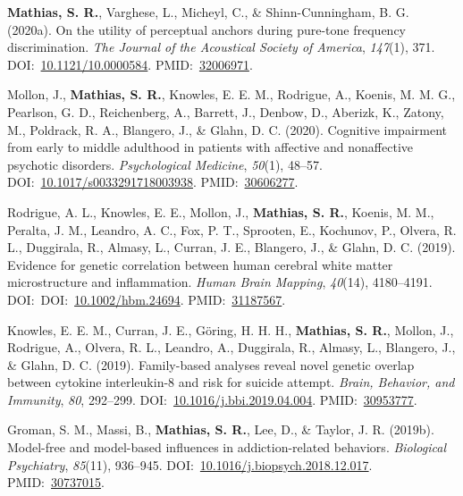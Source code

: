\documentclass[10pt]{article}
\makeatletter
\newlength{\bibhang}
\newlength{\bibsep}
 {\@listi \global\bibsep\itemsep \global\advance\bibsep by\parsep}
\newenvironment{bibsection}%
        {\vspace{-\baselineskip}\begin{list}{}{%
       \setlength{\leftmargin}{\bibhang}%
       \setlength{\itemindent}{-\leftmargin}%
       \setlength{\itemsep}{\bibsep}%
       \setlength{\parsep}{\z@}%
        \setlength{\partopsep}{0pt}%
        \setlength{\topsep}{0pt}}}
        {\end{list}\vspace{-.6\baselineskip}}
\makeatother
\begin{document}
\begin{bibsection}
\item \textbf{Mathias, S. R.}, Varghese, L.,  Micheyl, C., \& Shinn-Cunningham, B. G. (2020a). On the utility of perceptual anchors during pure-tone frequency discrimination. \emph{The Journal of the Acoustical Society of America}, \emph{147}(1), 371. 
DOI:~\href{https://doi.org/10.1121/10.0000584}{10.1121/10.0000584}. PMID:~\href{https://www.ncbi.nlm.nih.gov/pubmed/?term=32006971}{32006971}.

\item Mollon, J., \textbf{Mathias, S. R.}, Knowles, E. E. M., Rodrigue, A., Koenis, M. M. G., Pearlson, G. D., Reichenberg, A., Barrett, J., Denbow, D., Aberizk, K., Zatony, M., Poldrack, R. A., Blangero, J., \& Glahn, D. C. (2020). Cognitive impairment from early to middle adulthood in patients with affective and nonaffective psychotic disorders. \emph{Psychological Medicine}, \emph{50}(1), 48--57. DOI:~\href{https://doi.org/10.1017/s0033291718003938}{10.1017/s0033291718003938}. PMID:~\href{https://www.ncbi.nlm.nih.gov/pubmed/?term=30606277}{30606277}.


\item Rodrigue, A. L., Knowles, E. E., Mollon, J., \textbf{Mathias, S. R.}, Koenis, M. M., Peralta, J. M., Leandro, A. C., Fox, P. T., Sprooten, E., Kochunov, P., Olvera, R. L., Duggirala, R., Almasy, L., Curran, J. E., Blangero, J., \& Glahn, D. C. (2019). Evidence for genetic correlation between human cerebral white matter microstructure and inflammation. \emph{Human Brain Mapping}, \emph{40}(14), 4180--4191. DOI:~DOI:~\href{https://doi.org/10.1002/hbm.24694}{10.1002/hbm.24694}. PMID:~\href{https://www.ncbi.nlm.nih.gov/pubmed/?term=31187567}{31187567}.

\item Knowles, E. E. M., Curran, J. E., Göring, H. H. H., \textbf{Mathias, S. R.}, Mollon, J., Rodrigue, A., Olvera, R. L., Leandro, A., Duggirala, R., Almasy, L., Blangero, J., \& Glahn, D. C. (2019). Family-based analyses reveal novel genetic overlap between cytokine interleukin-8 and risk for suicide attempt. \emph{Brain, Behavior, and Immunity}, \emph{80}, 292--299. DOI:~\href{https://doi.org/10.1016/j.bbi.2019.04.004}{10.1016/j.bbi.2019.04.004}. PMID:~\href{https://www.ncbi.nlm.nih.gov/pubmed/?term=30953777}{30953777}.

\item Groman, S. M., Massi, B., \textbf{Mathias, S. R.}, Lee, D., \& Taylor, J. R. (2019b). Model-free and model-based influences in addiction-related behaviors. \emph{Biological Psychiatry}, \emph{85}(11), 936--945. DOI:~\href{https://doi.org/10.1016/j.biopsych.2018.12.017}{10.1016/j.biopsych.2018.12.017}. PMID:~\href{https://www.ncbi.nlm.nih.gov/pubmed/?term=30737015}{30737015}.


\end{bibsection}
\end{document}
